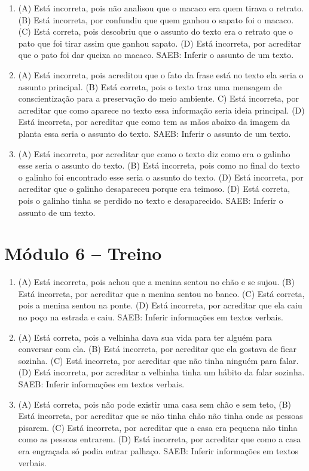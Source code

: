 \begin{enumerate}
\item
(A) Está incorreta, pois não analisou que o macaco era quem tirava o retrato.
(B) Está incorreta, por confundiu que quem ganhou o sapato foi o macaco.
(C) Está correta, pois descobriu que o assunto do texto era o retrato
que o pato que foi tirar assim que ganhou sapato.
(D) Está incorreta, por acreditar que o pato foi dar queixa ao macaco.
SAEB: Inferir o assunto de um texto.

\item
(A) Está incorreta, pois acreditou que o fato da frase está no texto ela
seria o assunto principal.
(B) Está correta, pois o texto traz uma mensagem de conscientização para
a preservação do meio ambiente.
C) Está incorreta, por acreditar que como aparece no texto essa
informação seria ideia principal.
(D) Está incorreta, por acreditar que como tem as mãos abaixo da imagem
da planta essa seria o assunto do texto.
SAEB: Inferir o assunto de um texto.

\item
(A) Está incorreta, por acreditar que como o texto diz como era o
galinho esse seria o assunto do texto.
(B) Está incorreta, pois como no final do texto o galinho foi encontrado
esse seria o assunto do texto.
(D) Está incorreta, por acreditar que o galinho desapareceu porque era
teimoso.
(D) Está correta, pois o galinho tinha se perdido no texto e
desaparecido.
SAEB: Inferir o assunto de um texto.
\end{enumerate}

\section*{Módulo 6 – Treino}

\begin{enumerate}
\item
(A) Está incorreta, pois achou que a menina sentou no chão e se sujou.
(B) Está incorreta, por acreditar que a menina sentou no banco.
(C) Está correta, pois a menina sentou na ponte.
(D) Está incorreta, por acreditar que ela caiu no poço na estrada e caiu.
SAEB: Inferir informações em textos verbais.

\item
(A) Está correta, pois a velhinha dava sua vida para ter alguém para conversar com ela.
(B) Está incorreta, por acreditar que ela gostava de ficar sozinha.
(C) Está incorreta, por acreditar que não tinha ninguém para falar.
(D) Está incorreta, por acreditar a velhinha tinha um hábito da falar sozinha.
SAEB: Inferir informações em textos verbais.

\item
(A) Está correta, pois não pode existir uma casa sem chão e sem teto,
(B) Está incorreta, por acreditar que se não tinha chão não tinha onde
as pessoas pisarem.
(C) Está incorreta, por acreditar que a casa era pequena não tinha como
as pessoas entrarem.
(D) Está incorreta, por acreditar que como a casa era engraçada só podia
entrar palhaço.
SAEB: Inferir informações em textos verbais.
\end{enumerate}

